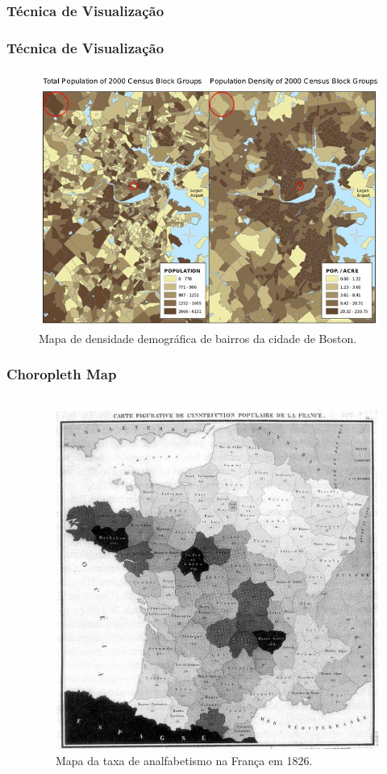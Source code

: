 \documentclass[aspectratio=169]{beamer}
\begin{document}
\begin{frame}
\frametitle{Técnica de Visualização}
\justifying


\end{frame}

\begin{frame}
\frametitle{Técnica de Visualização}
\justifying

\begin{figure}
\centering
\includegraphics[width=.45\textwidth]{images/boston-density.jpg}
\caption{Mapa de densidade demográfica de bairros da cidade de Boston.}
\end{figure}


\end{frame}

\begin{frame}
\frametitle{Choropleth Map}
\justifying

\begin{columns}

\begin{column}{0.5\textwidth}


\end{column}

\begin{column}{0.5\textwidth}

\begin{figure}
\centering
\includegraphics[width=.6\textwidth]{images/analfabetismo-franca.jpg}
\caption{Mapa da taxa de analfabetismo na França em 1826.}
\end{figure}


\end{column}
\end{columns}


\end{frame}
\end{document}

